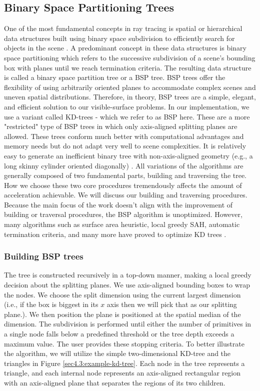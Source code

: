 \documentclass[a4paper,11pt,oneside]{article}
\begin{document}
\subsection{Binary Space Partitioning Trees}
\label{section:bsp-optimization}

One of the most fundamental concepts in ray tracing is spatial or hierarchical data structures built using binary space subdivision to efficiently search for objects in the scene \cite{ray_tracing_BSP2}. A predominant concept in these data structures is binary space partitioning which refers to the successive subdivision of a scene's bounding box with planes until we reach termination criteria. The resulting data structure is called a binary space partition tree or a BSP tree. BSP trees offer the flexibility of using arbitrarily oriented planes to accommodate complex scenes and uneven spatial distributions. Therefore, in theory, BSP trees are a simple, elegant, and efficient solution to our visible-surface problems. In our implementation, we use a variant called KD-trees - which we refer to as BSP here. These are a more "restricted" type of BSP trees in which only axis-aligned splitting planes are allowed. These trees conform much better with computational advantages and memory needs but do not adapt very well to scene complexities. It is relatively easy to generate an inefficient binary tree with non-axis-aligned geometry (e.g., a long skinny cylinder oriented diagonally) \cite{ray_tracing_BSP}. All variations of the algorithms are generally composed of two fundamental parts, building and traversing the tree. How we choose these two core procedures tremendously affects the amount of acceleration achievable. We will discuss our building and traversing procedures. Because the main focus of the work doesn't align with the improvement of building or traversal procedures, the BSP algorithm is unoptimized. However, many algorithms such as surface area heuristic, local greedy SAH, automatic termination criteria, and many more have proved to optimize KD trees \cite{fast_building_kd_trees, parallel_kd_tree_construction}.

\subsubsection{Building BSP trees}

The tree is constructed recursively in a top-down manner, making a local greedy decision about the splitting planes. We use axis-aligned bounding boxes to wrap the nodes. We choose the split dimension using the current largest dimension (i.e., if the box is biggest in its $x$ axis then we will pick that as our splitting plane.). We then position the plane is positioned at the spatial median of the dimension. The subdivision is performed until either the number of primitives in a single node falls below a predefined threshold or the tree depth exceeds a maximum value.  The user provides these stopping criteria. To better illustrate the algorithm, we will utilize the simple two-dimensional KD-tree and the triangles in Figure \ref{sec4.3:example-kd-tree}. Each node in the tree represents a triangle, and each internal node represents an axis-aligned rectangular region with an axis-aligned plane that separates the regions of its two children.
\end{document}
